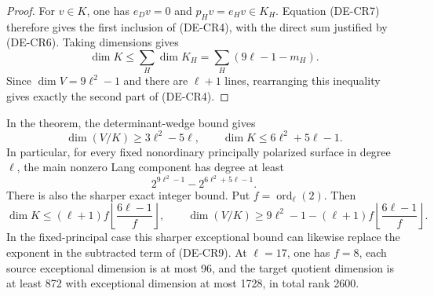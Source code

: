 \begin{proof}
For \(v\in K\), one has \(e_Dv=0\) and
\(p_Hv=e_Hv\in K_H\). Equation (DE-CR7) therefore gives
the first inclusion of (DE-CR4), with the direct sum justified
by (DE-CR6). Taking dimensions gives
\[
 \dim K\le\sum_H\dim K_H
           =\sum_H(9\ell-1-m_H).
\]
Since \(\dim V=9\ell^2-1\) and there are \(\ell+1\)
lines, rearranging this inequality gives exactly the second
part of (DE-CR4).
\end{proof}

\begin{corollary}
\label{cor:DE-prime-compatible-wedge-bound}
In the theorem, the determinant-wedge bound gives
\[
 \dim(V/K)\ge3\ell^2-5\ell,
 \qquad \dim K\le6\ell^2+5\ell-1.
 \tag{DE-CR8}
\]
In particular, for every fixed nonordinary principally polarized
surface in degree \(\ell\), the main nonzero Lang component has
degree at least
\[
          2^{9\ell^2-1}-2^{6\ell^2+5\ell-1}.
 \tag{DE-CR9}
\]
There is also the sharper exact integer bound. Put
\(f=\operatorname{ord}_\ell(2)\). Then
\[
 \dim K\le (\ell+1)f
                 \left\lfloor\frac{6\ell-1}{f}\right\rfloor,
 \qquad
 \dim(V/K)\ge9\ell^2-1-(\ell+1)f
                 \left\lfloor\frac{6\ell-1}{f}\right\rfloor.
 \tag{DE-CR10}
\]
In the fixed-principal case this sharper exceptional bound can
likewise replace the exponent in the subtracted term of (DE-CR9).
At \(\ell=17\), one has \(f=8\), each source exceptional
dimension is at most 96, and the target quotient dimension is
at least 872 with exceptional dimension at most 1728, in total
rank 2600.
\end{corollary}
